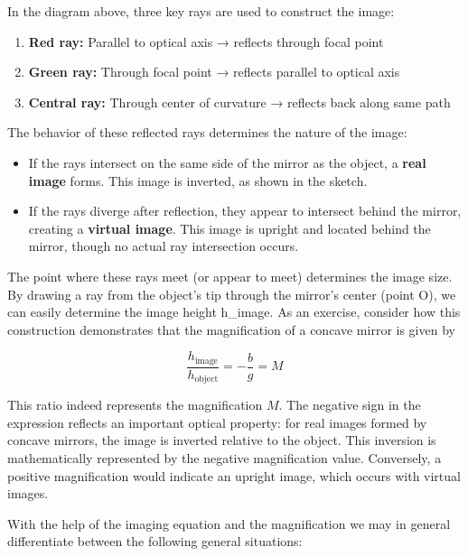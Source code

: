 \documentclass[
  a4paper,
]{book}
\providecommand{\tightlist}{%
  \setlength{\itemsep}{0pt}\setlength{\parskip}{0pt}}
\begin{document}
In the diagram above, three key rays are used to construct the image:

\begin{enumerate}
\def\labelenumi{\arabic{enumi}.}
\tightlist
\item
  \textbf{Red ray:} Parallel to optical axis → reflects through focal
  point
\item
  \textbf{Green ray:} Through focal point → reflects parallel to optical
  axis
\item
  \textbf{Central ray:} Through center of curvature → reflects back
  along same path
\end{enumerate}

The behavior of these reflected rays determines the nature of the image:

\begin{itemize}
\tightlist
\item
  If the rays intersect on the same side of the mirror as the object, a
  \textbf{real image} forms. This image is inverted, as shown in the
  sketch.
\item
  If the rays diverge after reflection, they appear to intersect behind
  the mirror, creating a \textbf{virtual image}. This image is upright
  and located behind the mirror, though no actual ray intersection
  occurs.
\end{itemize}

The point where these rays meet (or appear to meet) determines the image
size. By drawing a ray from the object's tip through the mirror's center
(point O), we can easily determine the image height h\_image. As an
exercise, consider how this construction demonstrates that the
magnification of a concave mirror is given by

\[ \frac{h_{\text{image}}}{h_{\text{object}}}=-\frac{b}{g}=M\]

This ratio indeed represents the magnification \(M\). The negative sign
in the expression reflects an important optical property: for real
images formed by concave mirrors, the image is inverted relative to the
object. This inversion is mathematically represented by the negative
magnification value. Conversely, a positive magnification would indicate
an upright image, which occurs with virtual images.

With the help of the imaging equation and the magnification we may in
general differentiate between the following general situations:
\end{document}
